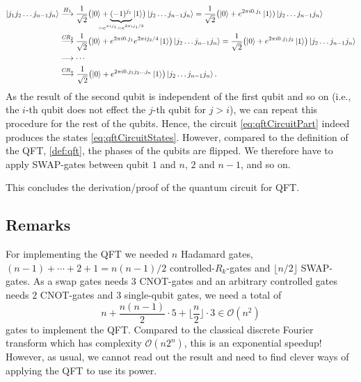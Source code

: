 			\begin{align}
				\ket{j_1 j_2 \dots j_{n - 1} j_n}
				 & \overset{H_1}{\longto}
				\frac{1}{\sqrt{2}} \bigl( \ket{0} + \underbrace{(-1)^{j_1}}_{\mathclap{= e^{\pi i j_1} = e^{2 \pi i j_1 / 2}}} \ket{1} \bigr) \ket{j_2 \dots j_{n - 1} j_n}
				= \frac{1}{\sqrt{2}} \bigl( \ket{0} + e^{2 \pi i 0.j_1} \ket{1}) \ket{j_2 \dots j_{n - 1} j_n}           \\
				 & \overset{\mathit{CR}_2}{\longto}
				\frac{1}{\sqrt{2}} \bigl( \ket{0} + e^{2 \pi i 0.j_1} e^{2 \pi i j_2 / 4} \ket{1} \bigr) \ket{j_2 \dots j_{n - 1} j_n}
				= \frac{1}{\sqrt{2}} \bigl( \ket{0} + e^{2 \pi i 0.j_1 j_2} \ket{1} \bigr) \ket{j_2 \dots j_{n - 1} j_n} \\
				 & \longto \cdots                                                                                        \\
				 & \overset{\mathit{CR}_n}{\longto}
				\frac{1}{\sqrt{2}} \bigl( \ket{0} + e^{2 \pi i 0.j_1 j_2 \dots j_n} \ket{1} \bigr) \ket{j_2 \dots j_{n - 1} j_n}.
			\end{align}
			As the result of the second qubit is independent of the first qubit and so on (i.e., the \(i\)-th qubit does not effect the \(j\)-th qubit for \(j > i\)), we can repeat this procedure for the rest of the qubits. Hence, the circuit \eqref{eq:qftCircuitPart} indeed produces the states \eqref{eq:qftCircuitStates}. However, compared to the definition of the \ac{QFT}, \autoref{def:qft}, the phases of the qubits are flipped. We therefore have to apply SWAP-gates between qubit \(1\) and \(n\), \(2\) and \(n - 1\), and so on.

			This concludes the derivation/proof of the quantum circuit for \ac{QFT}.

		\subsection{Remarks}
			For implementing the \ac{QFT} we needed \(n\) Hadamard gates, \( (n - 1) + \cdots + 2 + 1 = n (n - 1) / 2 \) controlled-\(R_k\)-gates and \( \lfloor n/2 \rfloor \) SWAP-gates. As a swap gates needs \(3\) CNOT-gates and an arbitrary controlled gates needs \(2\) CNOT-gates and \(3\) single-qubit gates, we need a total of
			\begin{equation}
				n + \frac{n (n - 1)}{2} \cdot 5 + \biggl\lfloor \frac{n}{2} \biggr\rfloor \cdot 3 \in \mathcal{O}(n^2)
			\end{equation}
			gates to implement the \acl{QFT}. Compared to the classical discrete Fourier transform which has complexity \( \mathcal{O}(n 2^n) \), this is an exponential speedup! However, as usual, we cannot read out the result and need to find clever ways of applying the \ac{QFT} to use its power.

